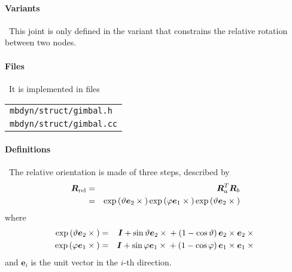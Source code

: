 \documentclass[10pt,dvips,fleqn]{report}
\newcommand{\T}[1]{\boldsymbol{#1}}
\begin{document}
\paragraph{Variants} \
This joint is only defined in the variant that constrains the relative
rotation between two nodes.

\paragraph{Files} \
It is implemented in files

\begin{tabular}{l}
\texttt{mbdyn/struct/gimbal.h} \\
\texttt{mbdyn/struct/gimbal.cc}
\end{tabular}

\paragraph{Definitions} \
The relative orientation is made of three steps, described by
\begin{eqnarray*}
	\T{R}_{\text{rel}}
	& = & \T{R}_a^T \T{R}_b \\
	& = & \llk{exp}\plbr{\vartheta \T{e}_2 \times{}}
		\llk{exp}\plbr{\varphi \T{e}_1 \times{}}
		\llk{exp}\plbr{\vartheta \T{e}_2 \times{}}
\end{eqnarray*}
where
\begin{eqnarray}
	\llk{exp}\plbr{\vartheta \T{e}_2 \times{}} & = &
		\T{I} + \sin\vartheta \T{e}_2\times{}
			+ \plbr{1 - \cos\vartheta}\T{e}_2\times\T{e}_2\times{}
		\label{eq:GIMBAL-EXP-THETA} \\
	\llk{exp}\plbr{\varphi \T{e}_1 \times{}} & = &
		\T{I} + \sin\varphi \T{e}_1\times{}
			+ \plbr{1 - \cos\varphi}\T{e}_1\times\T{e}_1\times{}
		\label{eq:GIMBAL-EXP-PHI}
\end{eqnarray}
and $\T{e}_i$ is the unit vector in the $i$-th direction.
\end{document}
